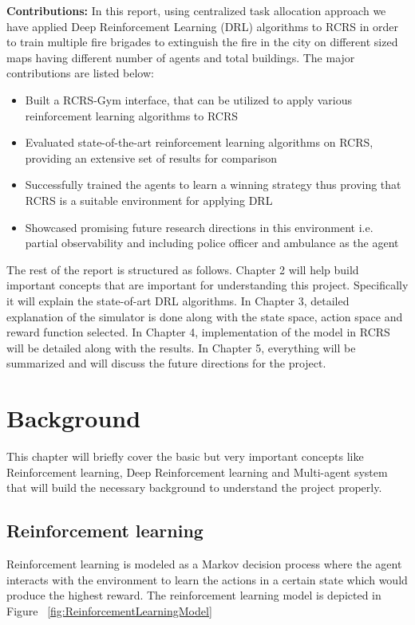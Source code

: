 \documentclass[12pt]{report}
\begin{document}
\textbf{Contributions:} In this report, using centralized task allocation approach we have applied Deep Reinforcement Learning (DRL) algorithms to RCRS in order to train multiple fire brigades to extinguish the fire in the city on different sized maps having different number of agents and total buildings. The major contributions are listed below: 

\begin{itemize}
    \item Built a RCRS-Gym interface, that can be utilized to apply various reinforcement learning algorithms to RCRS
    \item Evaluated state-of-the-art reinforcement learning algorithms on RCRS, providing an extensive set of results for comparison
    \item Successfully trained the agents to learn a winning strategy thus proving that RCRS is a suitable environment for applying DRL 
    \item Showcased promising future research directions in this environment i.e. partial observability and including police officer and ambulance as the agent
\end{itemize}

The rest of the report is structured as follows. Chapter 2 will help build important concepts that are important for understanding this project. Specifically it will explain the state-of-art DRL algorithms. In Chapter 3, detailed explanation of the simulator is done along with the state space, action space and reward function selected. In Chapter 4, implementation of the model in RCRS will be detailed along with the results. In Chapter 5, everything will be summarized and will discuss the future directions for the project. 


\chapter{Background}                       

This chapter will briefly cover the basic but very important concepts like Reinforcement learning, Deep Reinforcement learning and Multi-agent system that will build the necessary background to understand the project properly.  

\section{Reinforcement learning}

Reinforcement learning is modeled as a Markov decision process where the agent interacts with the environment to learn the actions in a certain state which would produce the highest reward. The reinforcement learning model is depicted in Figure ~\ref{fig:ReinforcementLearningModel} 
\end{document}
